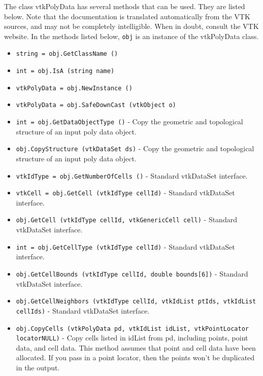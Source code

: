 The class vtkPolyData has several methods that can be used.
  They are listed below.
Note that the documentation is translated automatically from the VTK sources,
and may not be completely intelligible.  When in doubt, consult the VTK website.
In the methods listed below, \verb|obj| is an instance of the vtkPolyData class.
\begin{itemize}
\item  \verb|string = obj.GetClassName ()|

\item  \verb|int = obj.IsA (string name)|

\item  \verb|vtkPolyData = obj.NewInstance ()|

\item  \verb|vtkPolyData = obj.SafeDownCast (vtkObject o)|

\item  \verb|int = obj.GetDataObjectType ()| -  Copy the geometric and topological structure of an input poly data object.

\item  \verb|obj.CopyStructure (vtkDataSet ds)| -  Copy the geometric and topological structure of an input poly data object.

\item  \verb|vtkIdType = obj.GetNumberOfCells ()| -  Standard vtkDataSet interface.

\item  \verb|vtkCell = obj.GetCell (vtkIdType cellId)| -  Standard vtkDataSet interface.

\item  \verb|obj.GetCell (vtkIdType cellId, vtkGenericCell cell)| -  Standard vtkDataSet interface.

\item  \verb|int = obj.GetCellType (vtkIdType cellId)| -  Standard vtkDataSet interface.

\item  \verb|obj.GetCellBounds (vtkIdType cellId, double bounds[6])| -  Standard vtkDataSet interface.

\item  \verb|obj.GetCellNeighbors (vtkIdType cellId, vtkIdList ptIds, vtkIdList cellIds)| -  Standard vtkDataSet interface.

\item  \verb|obj.CopyCells (vtkPolyData pd, vtkIdList idList, vtkPointLocator locatorNULL)| -  Copy cells listed in idList from pd, including points, point data,
 and cell data.  This method assumes that point and cell data have
 been allocated.  If you pass in a point locator, then the points
 won't be duplicated in the output.


\end{itemize}
